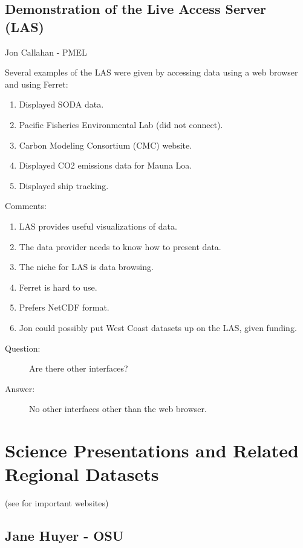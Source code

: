 \subsection{Demonstration of the Live Access Server (LAS)}

Jon Callahan - PMEL

Several examples of the LAS were given by accessing data using a web
browser and using Ferret:

\begin{enumerate}
\item Displayed SODA data.
\item Pacific Fisheries Environmental Lab (did not connect).
\item Carbon Modeling Consortium (CMC) website.
\item Displayed CO2 emissions data for Mauna Loa. 
\item Displayed ship tracking.
\end{enumerate}

Comments:

\begin{enumerate}
\item LAS provides useful visualizations of data.
\item The data provider needs to know how to present data.  
\item The niche for LAS is data browsing.
\item Ferret is hard to use.
\item Prefers NetCDF format.
\item Jon could possibly put West Coast datasets up on the LAS, given
  funding.
\end{enumerate}

\begin{description}
\item[Question:]  Are there other interfaces?
\item[Answer:]  No other interfaces other than the web browser.
\end{description}

\section{Science Presentations and Related Regional Datasets}

 (see 
for important websites)

\subsection{Jane Huyer - OSU}


